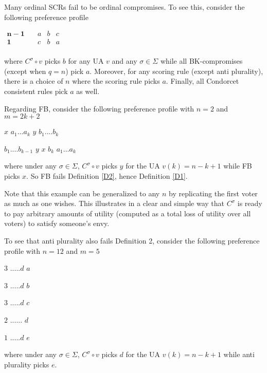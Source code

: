 \documentclass[version=3.21, pagesize, notitlepage, twoside=off, bibliography=totoc, DIV=calc, fontsize=12pt, a4paper]{scrartcl}
\begin{document}
\begin{example}
	\label{ex:qeqn}
Many ordinal SCRs fail to be ordinal compromises. To see this, consider the following preference profile

\begin{center}
	$
	\begin{array}{cccc}
	\mathbf{n-1} \quad &a&b&c\\
	\mathbf{1} \quad &c&b&a\\
	\end{array}
	$
\end{center}

where $C^{\sigma }\circ v$ picks $b$ for any UA $v$ and any $\sigma \in \Sigma $ while all BK-compromises (except when $q=n$) pick $a$. Moreover, for any scoring rule (except anti plurality), there is a choice of $n$ where the scoring rule picks $a$. Finally, all Condorcet consistent rules pick $a$ as well.
\end{example}

Regarding FB, consider the following preference profile with $n=2$ and $m=2k+2$

\bigskip

$x$ $a_{1}...a_{k}$ $y$ $b_{1}....b_{k}$

$b_{1}....b_{k-1}$ $y$ $x$ $b_{k}$ $a_{1}...a_{k}$

\bigskip

where under any $\sigma \in \Sigma $, $C^{\sigma }\circ v$ picks $y$ for the UA $v(k)=n-k+1$ while FB picks $x$. So FB fails Definition \ref{D2}, hence Definition \ref{D1}.

Note that this example can be generalized to any $n$ by replicating the first voter as much as one wishes. This illustrates in a clear and simple
way that $C^{\sigma }$ is ready to pay arbitrary amounts of utility (computed as a total loss of utility over all voters) to satisfy someone's envy.

To see that anti plurality also fails Definition 2, consider the following preference profile with $n=12$ and $m=5$

$3$ $.....d$ $a$

$3$ $.....d$ $b$

$3$ $.....d$ $c$

$2$ $......$ $d$

$1$ $.....d$ $e$

\bigskip

where under any $\sigma \in \Sigma $, $C^{\sigma }\circ v$ picks $d$ for the UA $v(k)=n-k+1$ while anti plurality picks $e$.
\end{document}
